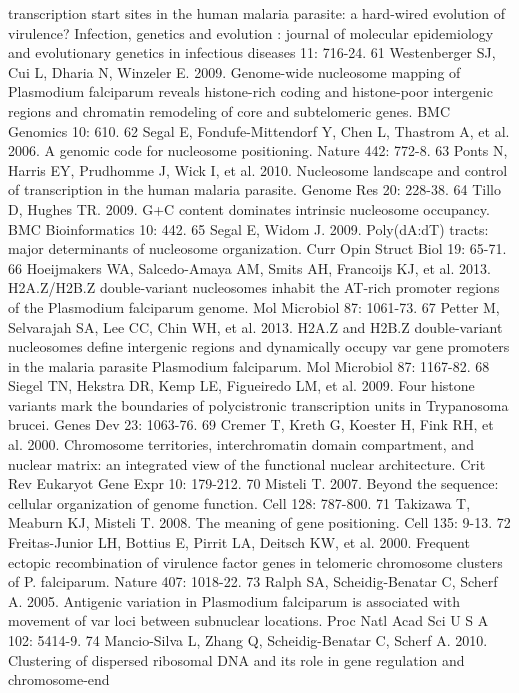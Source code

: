 transcription start sites in the human malaria parasite: a hard-wired
evolution of virulence? Infection, genetics and evolution : journal of
molecular epidemiology and evolutionary genetics in infectious diseases 11:
716-24.
61  Westenberger SJ, Cui L, Dharia N, Winzeler E. 2009. Genome-wide nucleosome
mapping of Plasmodium falciparum reveals histone-rich coding and histone-poor
intergenic regions and chromatin remodeling of core and subtelomeric genes.
BMC Genomics 10: 610.
62  Segal E, Fondufe-Mittendorf Y, Chen L, Thastrom A, et al. 2006. A genomic
code for nucleosome positioning. Nature 442: 772-8.
63  Ponts N, Harris EY, Prudhomme J, Wick I, et al. 2010. Nucleosome landscape
and control of transcription in the human malaria parasite. Genome Res 20:
228-38.
64  Tillo D, Hughes TR. 2009. G+C content dominates intrinsic nucleosome
occupancy. BMC Bioinformatics 10: 442.
65  Segal E, Widom J. 2009. Poly(dA:dT) tracts: major determinants of
nucleosome organization. Curr Opin Struct Biol 19: 65-71.
66  Hoeijmakers WA, Salcedo-Amaya AM, Smits AH, Francoijs KJ, et al. 2013.
H2A.Z/H2B.Z double-variant nucleosomes inhabit the AT-rich promoter regions of
the Plasmodium falciparum genome. Mol Microbiol 87: 1061-73.
67  Petter M, Selvarajah SA, Lee CC, Chin WH, et al. 2013. H2A.Z and H2B.Z
double-variant nucleosomes define intergenic regions and dynamically occupy
var gene promoters in the malaria parasite Plasmodium falciparum. Mol
Microbiol 87: 1167-82.
68  Siegel TN, Hekstra DR, Kemp LE, Figueiredo LM, et al. 2009. Four histone
variants mark the boundaries of polycistronic transcription units in
Trypanosoma brucei. Genes Dev 23: 1063-76.
69  Cremer T, Kreth G, Koester H, Fink RH, et al. 2000. Chromosome
territories, interchromatin domain compartment, and nuclear matrix: an
integrated view of the functional nuclear architecture. Crit Rev Eukaryot Gene
Expr 10: 179-212.
70  Misteli T. 2007. Beyond the sequence: cellular organization of genome
function. Cell 128: 787-800.
71  Takizawa T, Meaburn KJ, Misteli T. 2008. The meaning of gene positioning.
Cell 135: 9-13.
72  Freitas-Junior LH, Bottius E, Pirrit LA, Deitsch KW, et al. 2000. Frequent
ectopic recombination of virulence factor genes in telomeric chromosome
clusters of P. falciparum. Nature 407: 1018-22.
73  Ralph SA, Scheidig-Benatar C, Scherf A. 2005. Antigenic variation in
Plasmodium falciparum is associated with movement of var loci between
subnuclear locations. Proc Natl Acad Sci U S A 102: 5414-9.
74  Mancio-Silva L, Zhang Q, Scheidig-Benatar C, Scherf A. 2010. Clustering of
dispersed ribosomal DNA and its role in gene regulation and chromosome-end

